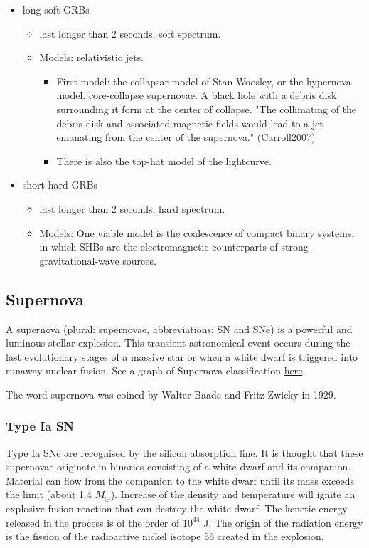 \begin{itemize}
\item long-soft GRBs
\begin{itemize}
\item last longer than 2 seconds, soft spectrum.
\item Models: relativistic jets.
\begin{itemize}
\item First model: the collapsar model of Stan Woosley, or the hypernova
model. core-collapse supernovae. A black hole with a debris disk
surrounding it form at the center of collapse. "The collimating of
the debris disk and associated magnetic fields would lead to a jet
emanating from the center of the supernova." (Carroll2007)
\item There is also the top-hat model of the lightcurve.
\end{itemize}
\end{itemize}
\item short-hard GRBs
\begin{itemize}
\item last longer than 2 seconds, hard spectrum.
\item Models: One viable model is the coalescence of compact binary
systems, in which SHBs are the electromagnetic counterparts of
strong gravitational-wave sources.
\end{itemize}
\end{itemize}

\subsection{Supernova}
\label{sec:orga01460e}

A supernova (plural: supernovae, abbreviations: SN and SNe) is a powerful and luminous stellar explosion. This transient astronomical event occurs during the last evolutionary stages of a massive star or when a white dwarf is triggered into runaway nuclear fusion. See a graph of Supernova classification \href{file:///Users/chongchonghe/Dropbox/Notability2/Container/Supernova.pdf}{here}.

The word supernova was coined by Walter Baade and Fritz Zwicky in 1929.

\subsubsection{Type Ia SN}
\label{sec:orgf938d79}

Type Ia SNe are recognised by the silicon absorption line. It is thought that these supernovae originate in binaries consisting of a white dwarf and its companion. Material can flow from the companion to the white dwarf until its mass exceeds the limit (about 1.4 \(M_\odot\)). Increase of the density and temperature will ignite an explosive fusion reaction that can destroy the white dwarf. The kenetic energy released in the process is of the order of \(10^{44}\) J. The origin of the radiation energy is the fission of the radioactive nickel isotope 56 created in the explosion.

